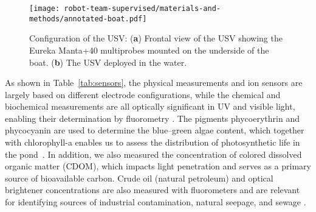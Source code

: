 \begin{figure}[H]
\hspace{-6pt}\texttt{[image: robot-team-supervised/materials-and-methods/annotated-boat.pdf]}
\caption{Configuration of the USV: (\textbf{a}) Frontal view of the USV showing the Eureka Manta+40 multiprobes mounted on the underside of the boat. (\textbf{b}) The USV deployed in the water.\label{fig:boat-components}}
\end{figure}

As shown in Table~\ref{tab:sensors}, the physical measurements and ion sensors
are largely based on different electrode configurations, while the chemical and
biochemical measurements are all optically significant in UV and visible light,
enabling their determination by fluorometry
\cite{de2007ion,trees2002fluorometric,tillman2017evaluation}. The pigments
phycoerythrin and phycocyanin are used to determine the blue--green algae
content, which together with chlorophyll-a enables us to assess the distribution
of photosynthetic life in the pond~\cite{Brient2008APP, boyer2009phytoplankton}.
In addition, we also measured the concentration of colored dissolved organic
matter (CDOM), which impacts light penetration and serves as a primary source of
bioavailable carbon. Crude oil (natural petroleum) and optical brightener
concentrations are also measured with fluorometers and are relevant for
identifying sources of industrial contamination, natural seepage, and sewage
\cite{brown2003review,cao2009evaluation}.

